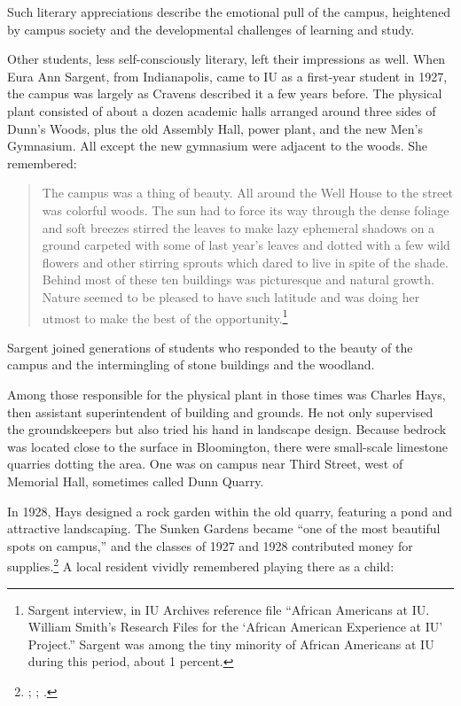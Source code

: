 \documentclass[
  american,
  letterpaper,
]{scrreprt}
\begin{document}
Such literary appreciations describe the emotional pull of the campus,
heightened by campus society and the developmental challenges of
learning and study.

Other students, less self-consciously literary, left their impressions
as well. When Eura Ann Sargent, from Indianapolis, came to IU as a
first-year student in 1927, the campus was largely as Cravens described
it a few years before. The physical plant consisted of about a dozen
academic halls arranged around three sides of Dunn's Woods, plus the old
Assembly Hall, power plant, and the new Men's Gymnasium. All except the
new gymnasium were adjacent to the woods. She remembered:

\begin{quote}
The campus was a thing of beauty. All around the Well House to the
street was colorful woods. The sun had to force its way through the
dense foliage and soft breezes stirred the leaves to make lazy ephemeral
shadows on a ground carpeted with some of last year's leaves and dotted
with a few wild flowers and other stirring sprouts which dared to live
in spite of the shade. Behind most of these ten buildings was
picturesque and natural growth. Nature seemed to be pleased to have such
latitude and was doing her utmost to make the best of the
opportunity.\footnote{Sargent interview, in IU Archives reference file
  ``African Americans at IU. William Smith's Research Files for the
  `African American Experience at IU' Project.'' Sargent was among the
  tiny minority of African Americans at IU during this period, about 1
  percent.}
\end{quote}

Sargent joined generations of students who responded to the beauty of
the campus and the intermingling of stone buildings and the woodland.

Among those responsible for the physical plant in those times was
Charles Hays, then assistant superintendent of building and grounds. He
not only supervised the groundskeepers but also tried his hand in
landscape design. Because bedrock was located close to the surface in
Bloomington, there were small-scale limestone quarries dotting the area.
One was on campus near Third Street, west of Memorial Hall, sometimes
called Dunn Quarry.

In 1928, Hays designed a rock garden within the old quarry, featuring a
pond and attractive landscaping. The Sunken Gardens became ``one of the
most beautiful spots on campus,'' and the classes of 1927 and 1928
contributed money for supplies.\footnote{;
  ;
  .} A local resident vividly remembered
playing there as a child:
\end{document}
